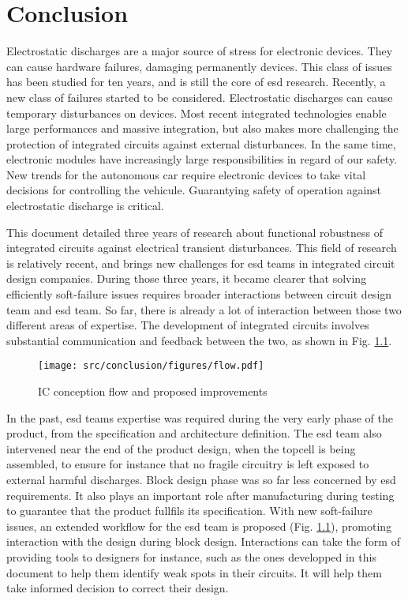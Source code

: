 \chapter{Conclusion}
\label{sec:final-conclusion}

Electrostatic discharges are a major source of stress for electronic devices.
They can cause hardware failures, damaging permanently devices.
This class of issues has been studied for ten years, and is still the core of \gls{esd} research.
Recently, a new class of failures started to be considered.
Electrostatic discharges can cause temporary disturbances on devices.
Most recent integrated technologies enable large performances and massive integration, but also makes more challenging the protection of integrated circuits against external disturbances.
In the same time, electronic modules have increasingly large responsibilities in regard of our safety.
New trends for the autonomous car require electronic devices to take vital decisions for controlling the vehicule.
Guarantying safety of operation against electrostatic discharge is critical.

This document detailed three years of research about functional robustness of integrated circuits against electrical transient disturbances.
This field of research is relatively recent, and brings new challenges for \gls{esd} teams in integrated circuit design companies.
During those three years, it became clearer that solving efficiently soft-failure issues requires broader interactions between circuit design team and \gls{esd} team.
So far, there is already a lot of interaction between those two different areas of expertise.
The development of integrated circuits involves substantial communication and feedback between the two, as shown in Fig. \ref{fig:new-flow}.

\begin{figure}[!h]
  \centering
  \texttt{[image: src/conclusion/figures/flow.pdf]}
  \caption{IC conception flow and proposed improvements}
  \label{fig:new-flow}
\end{figure}

In the past, \gls{esd} teams expertise was required during the very early phase of the product, from the specification and architecture definition.
The \gls{esd} team also intervened near the end of the product design, when the topcell is being assembled, to ensure for instance that no fragile circuitry is left exposed to external harmful discharges.
Block design phase was so far less concerned by \gls{esd} requirements.
It also plays an important role after manufacturing during testing to guarantee that the product fullfils its specification.
With new soft-failure issues, an extended workflow for the \gls{esd} team is proposed (Fig. \ref{fig:new-flow}), promoting interaction with the design during block design.
Interactions can take the form of providing tools to designers for instance, such as the ones developped in this document to help them identify weak spots in their circuits.
It will help them take informed decision to correct their design.

